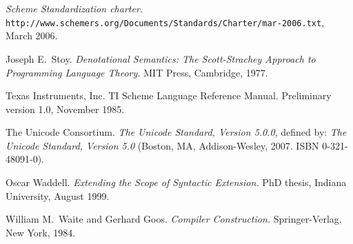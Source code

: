 \begin{thebibliography}{999}
{\em Scheme Standardization charter.}
{\tt
  http://www.\linebreak[1]schemers.\linebreak[1]org/\linebreak[1]Documents/\linebreak[1]Standards/\linebreak[1]Charter/\linebreak[1]mar-2006.txt},
March 2006.

Joseph E.~Stoy.
{\em Denotational Semantics: The Scott-Strachey Approach to
  Programming Language Theory.}
MIT Press, Cambridge, 1977.

Texas Instruments, Inc.
TI Scheme Language Reference Manual.
Preliminary version 1.0, November 1985. 

The Unicode Consortium.
{\em  The Unicode Standard, Version 5.0.0},
defined by: {\em The Unicode Standard, Version 5.0} (Boston, MA,
 Addison-Wesley, 2007. ISBN 0-321-48091-0).

Oscar Waddell.
{\em Extending the Scope of Syntactic Extension.}
PhD thesis, Indiana University, August 1999.

William M.~Waite and Gerhard Goos.
{\em Compiler Construction.}
Springer-Verlag, New York, 1984.

\end{thebibliography}

